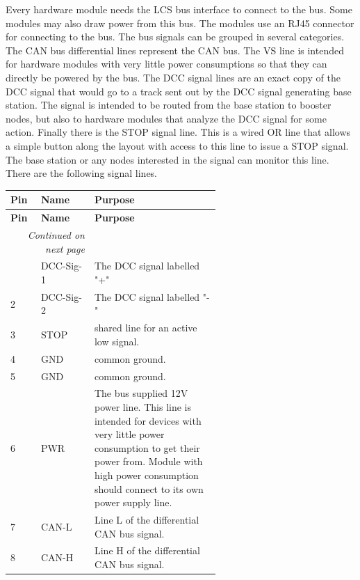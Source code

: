 
Every hardware module needs the LCS bus interface to connect to the bus. Some modules may also draw power from this bus. The modules use an RJ45 connector for connecting to the bus. The bus signals can be grouped in several categories. The CAN bus differential lines represent the CAN bus. The VS line is intended for hardware modules with very little power consumptions so that they can directly be powered by the bus. The DCC signal lines are an exact copy of the DCC signal that would go to a track sent out by the DCC signal generating base station. The signal is intended to be routed from the base station to booster nodes, but also to hardware modules that analyze the DCC signal for some action. Finally there is the STOP signal line. This is a wired OR line that allows a simple button along the layout with access to this line to issue a STOP signal. The base station or any nodes interested in the signal can monitor this line. There are the following signal lines.

\begin{longtable}{@{}|l|l|p{0.6\linewidth}|@{}}
    \toprule
    \textbf{Pin} & \textbf{Name} & \textbf{Purpose} \\
    \midrule
    \endfirsthead
    \toprule
    \textbf{Pin} & \textbf{Name} & \textbf{Purpose} \\
    \midrule
    \endhead
    \midrule
    \multicolumn{2}{r}{\textit{Continued on next page}} \\
    \midrule
    \endfoot
    \bottomrule
    \endlastfoot
    1 & DCC-Sig-1 & The DCC signal labelled "+" \\
    \midrule
    2 & DCC-Sig-2 & The DCC signal labelled "-" \\
    \midrule
    3 & STOP & shared line for an active low signal. \\
    \midrule
    4 & GND & common ground. \\
    \midrule
    5 & GND & common ground. \\
    \midrule
    6 & PWR & The bus supplied 12V power line. This line is intended for devices with very little power consumption to get their power from. Module with high power consumption should connect to its own power supply line. \\
    \midrule
    7 & CAN-L &  Line L of the differential CAN bus signal. \\
    \midrule
    8 & CAN-H &  Line H of the differential CAN bus signal. \\
\end{longtable}

